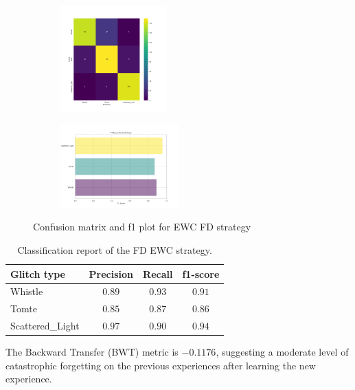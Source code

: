 \begin{figure}[!ht]
\centering
\begin{subfigure}
  \centering
  \includegraphics[width=0.45\textwidth]{Images/cm_FD_model_EWC.png}  
  \label{fig:fd_sub-first}
\end{subfigure}
\begin{subfigure}
  \centering
  \includegraphics[width=0.50\textwidth]{Images/f1_FD_model_EWC.png}  
  \label{fig:fd_sub-second}
\end{subfigure}
\caption{Confusion matrix and f1 plot for EWC FD strategy}
\label{fig:cm_f1_FD_EWC}
\end{figure}

\begin{table}[!ht]
\centering
    \begin{tabular}{|l|c c c|}
    \hline
    \textbf{Glitch type} & \textbf{Precision} & \textbf{Recall} & \textbf{f1-score} \\ \hline
    Whistle & $0.89$ & $0.93$ & $0.91$ \\
    Tomte & $0.85$ & $0.87$ & $0.86$ \\
    Scattered\_Light & $0.97$ & $0.90$ & $0.94$ \\
    \hline
    \end{tabular}
    \caption{Classification report of the FD EWC strategy.}
    \label{tbl:RQ2_class_report_FD_EWC}
\end{table}

The Backward Transfer (BWT) metric is $-0.1176$, suggesting a moderate level of catastrophic forgetting on the previous experiences after learning the new experience.

